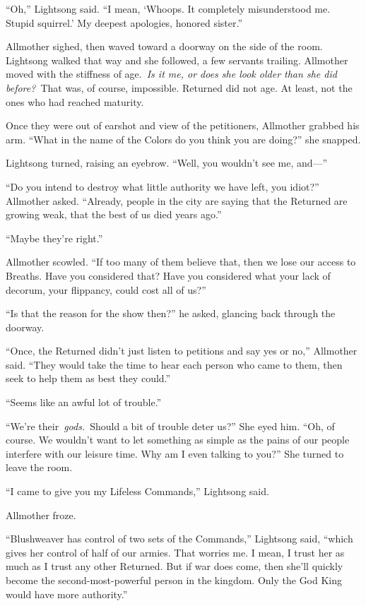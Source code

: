 “Oh,” Lightsong said. “I mean, ‘Whoops. It completely misunderstood me. Stupid squirrel.’ My deepest apologies, honored sister.”

Allmother sighed, then waved toward a doorway on the side of the room. Lightsong walked that way and she followed, a few servants trailing. Allmother moved with the stiffness of age.~\textit{Is it me, or does she look older than she did before?}~That was, of course, impossible. Returned did not age. At least, not the ones who had reached maturity.

Once they were out of earshot and view of the petitioners, Allmother grabbed his arm. “What in the name of the Colors do you think you are doing?” she snapped.

Lightsong turned, raising an eyebrow. “Well, you wouldn’t see me, and—”

“Do you intend to destroy what little authority we have left, you idiot?” Allmother asked. “Already, people in the city are saying that the Returned are growing weak, that the best of us died years ago.”

“Maybe they’re right.”

Allmother scowled. “If too many of them believe that, then we lose our access to Breaths. Have you considered that? Have you considered what your lack of decorum, your flippancy, could cost all of us?”

“Is that the reason for the show then?” he asked, glancing back through the doorway.

“Once, the Returned didn’t just listen to petitions and say yes or no,” Allmother said. “They would take the time to hear each person who came to them, then seek to help them as best they could.”

“Seems like an awful lot of trouble.”

“We’re their~\textit{gods.}~Should a bit of trouble deter us?” She eyed him. “Oh, of course. We wouldn’t want to let something as simple as the pains of our people interfere with our leisure time. Why am I even talking to you?” She turned to leave the room.

“I came to give you my Lifeless Commands,” Lightsong said.

Allmother froze.

“Blushweaver has control of two sets of the Commands,” Lightsong said, “which gives her control of half of our armies. That worries me. I mean, I trust her as much as I trust any other Returned. But if war does come, then she’ll quickly become the second-most-powerful person in the kingdom. Only the God King would have more authority.”

